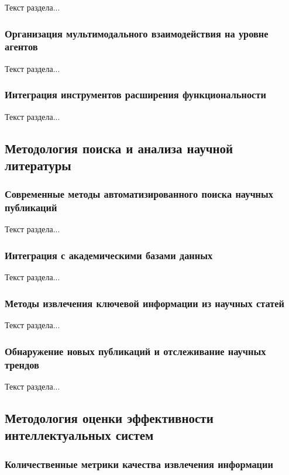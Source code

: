 Текст раздела...

\subsubsection{Организация мультимодального взаимодействия на уровне агентов}

Текст раздела...

\subsubsection{Интеграция инструментов расширения функциональности}

Текст раздела...

\subsection{Методология поиска и анализа научной литературы}

\subsubsection{Современные методы автоматизированного поиска научных публикаций}

Текст раздела...

\subsubsection{Интеграция с академическими базами данных}

Текст раздела...

\subsubsection{Методы извлечения ключевой информации из научных статей}

Текст раздела...

\subsubsection{Обнаружение новых публикаций и отслеживание научных трендов}

Текст раздела...

\subsection{Методология оценки эффективности интеллектуальных систем}

\subsubsection{Количественные метрики качества извлечения информации}


